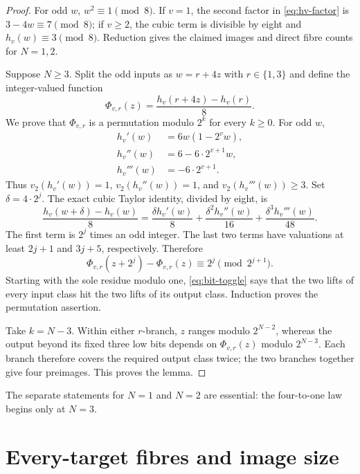 \documentclass[a4paper,10pt]{amsart}
\theoremstyle{remark}
\newcommand{\vtwo}{v_2}
\begin{document}
\begin{proof}
For odd $w$, $w^2\equiv1\pmod8$.  If $v=1$, the second factor in
\eqref{eq:hv-factor} is $3-4w\equiv7\pmod8$; if $v\geq2$, the cubic
term is divisible by eight and $h_v(w)\equiv3\pmod8$.  Reduction gives
the claimed images and direct fibre counts for $N=1,2$.

Suppose $N\geq3$.  Split the odd inputs as $w=r+4z$ with
$r\in\{1,3\}$ and define the integer-valued function
\begin{equation}\label{eq:phi}
 \Phi_{v,r}(z)=\frac{h_v(r+4z)-h_v(r)}8.
\end{equation}
We prove that $\Phi_{v,r}$ is a permutation modulo $2^k$ for every $k\geq0$.
For odd $w$,
\begin{align*}
 h_v'(w)&=6w(1-2^vw),\\
 h_v''(w)&=6-6\cdot2^{v+1}w,\\
 h_v'''(w)&=-6\cdot2^{v+1}.
\end{align*}
Thus $\vtwo(h_v'(w))=1$, $\vtwo(h_v''(w))=1$, and
$\vtwo(h_v'''(w))\geq3$.  Set $\delta=4\cdot2^j$.  The exact cubic
Taylor identity, divided by eight, is
\begin{equation}\label{eq:taylor}
 \frac{h_v(w+\delta)-h_v(w)}8
 =\frac{\delta h_v'(w)}8
  +\frac{\delta^2h_v''(w)}{16}
  +\frac{\delta^3h_v'''(w)}{48}.
\end{equation}
The first term is $2^j$ times an odd integer.  The last two terms have
valuations at least $2j+1$ and $3j+5$, respectively.  Therefore
\begin{equation}\label{eq:bit-toggle}
 \Phi_{v,r}(z+2^j)-\Phi_{v,r}(z)
 \equiv2^j\pmod {2^{j+1}}.
\end{equation}
Starting with the sole residue modulo one, \eqref{eq:bit-toggle} says that
the two lifts of every input class hit the two lifts of its output class.
Induction proves the permutation assertion.

Take $k=N-3$.  Within either $r$-branch, $z$ ranges modulo $2^{N-2}$,
whereas the output beyond its fixed three low bits depends on
$\Phi_{v,r}(z)$ modulo $2^{N-3}$.  Each branch therefore covers the required
output class twice; the two branches together give four preimages.  This
proves the lemma.
\end{proof}

The separate statements for $N=1$ and $N=2$ are essential: the four-to-one
law begins only at $N=3$.

\section{Every-target fibres and image size}\label{sec:fibres}
\end{document}
